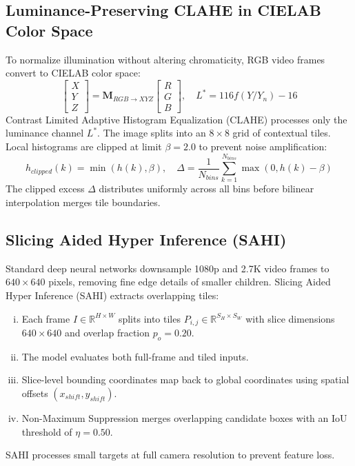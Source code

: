 \subsection{Luminance-Preserving CLAHE in CIELAB Color Space}
To normalize illumination without altering chromaticity, RGB video frames convert to CIELAB color space:
\begin{equation}
    \begin{bmatrix} X \\ Y \\ Z \end{bmatrix} = \mathbf{M}_{RGB \to XYZ} \begin{bmatrix} R \\ G \\ B \end{bmatrix}, \quad L^* = 116 f(Y/Y_n) - 16
\end{equation}
Contrast Limited Adaptive Histogram Equalization (CLAHE) processes only the luminance channel $L^*$. The image splits into an $8 \times 8$ grid of contextual tiles. Local histograms are clipped at limit $\beta = 2.0$ to prevent noise amplification:
\begin{equation}
    h_{clipped}(k) = \min(h(k), \beta), \quad \Delta = \frac{1}{N_{bins}} \sum_{k=1}^{N_{bins}} \max(0, h(k) - \beta)
\end{equation}
The clipped excess $\Delta$ distributes uniformly across all bins before bilinear interpolation merges tile boundaries.

\subsection{Slicing Aided Hyper Inference (SAHI)}
Standard deep neural networks downsample 1080p and 2.7K video frames to $640 \times 640$ pixels, removing fine edge details of smaller children. Slicing Aided Hyper Inference (SAHI) \cite{akyon2022sahi} extracts overlapping tiles:
\begin{enumerate}[(i)]
    \item Each frame $I \in \mathbb{R}^{H \times W}$ splits into tiles $P_{i,j} \in \mathbb{R}^{S_H \times S_W}$ with slice dimensions $640 \times 640$ and overlap fraction $p_o = 0.20$.
    \item The model evaluates both full-frame and tiled inputs.
    \item Slice-level bounding coordinates map back to global coordinates using spatial offsets $(x_{shift}, y_{shift})$.
    \item Non-Maximum Suppression merges overlapping candidate boxes with an IoU threshold of $\eta = 0.50$.
\end{enumerate}
SAHI processes small targets at full camera resolution to prevent feature loss.


